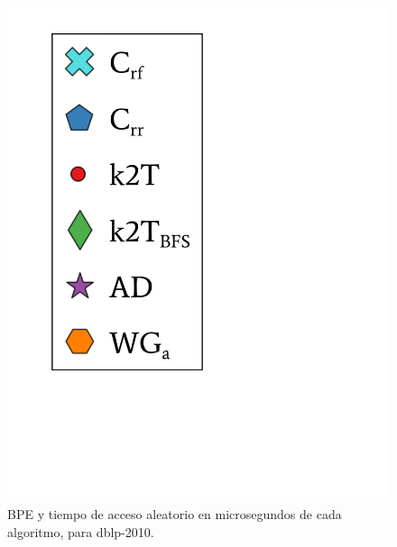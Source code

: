 \begin{frame}
\begin{figure}
\begin{minipage}{1\textwidth}
\begin{minipage}{0.15\textwidth}
    			\includegraphics[scale=.16, clip, trim=70 200 280 40]{../img/bpeTimes/labelAle.pdf}
    		\end{minipage}	
    	\end{minipage}

	\caption{BPE y tiempo de acceso aleatorio en microsegundos de cada algoritmo, para dblp-2010.}
\end{figure}

\end{frame}

